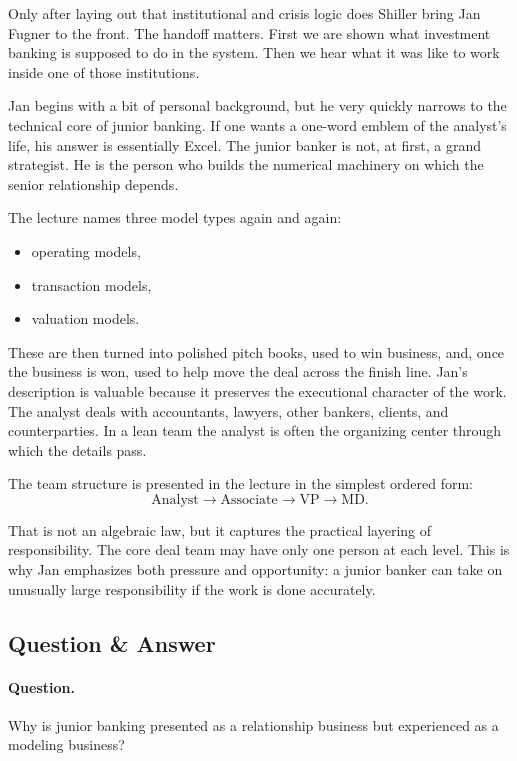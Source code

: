Only after laying out that institutional and crisis logic does Shiller bring Jan Fugner to the front. The handoff matters. First we are shown what investment banking is supposed to do in the system. Then we hear what it was like to work inside one of those institutions.

Jan begins with a bit of personal background, but he very quickly narrows to the technical core of junior banking. If one wants a one-word emblem of the analyst's life, his answer is essentially Excel. The junior banker is not, at first, a grand strategist. He is the person who builds the numerical machinery on which the senior relationship depends.

The lecture names three model types again and again:
\begin{itemize}
\item operating models,
\item transaction models,
\item valuation models.
\end{itemize}

These are then turned into polished pitch books, used to win business, and, once the business is won, used to help move the deal across the finish line. Jan's description is valuable because it preserves the executional character of the work. The analyst deals with accountants, lawyers, other bankers, clients, and counterparties. In a lean team the analyst is often the organizing center through which the details pass.

The team structure is presented in the lecture in the simplest ordered form:
\begin{equation}
\text{Analyst}\to\text{Associate}\to\text{VP}\to\text{MD}.
\end{equation}

That is not an algebraic law, but it captures the practical layering of responsibility. The core deal team may have only one person at each level. This is why Jan emphasizes both pressure and opportunity: a junior banker can take on unusually large responsibility if the work is done accurately.

\subsection{Question \& Answer}

\paragraph{Question.} Why is junior banking presented as a relationship business but experienced as a modeling business?

